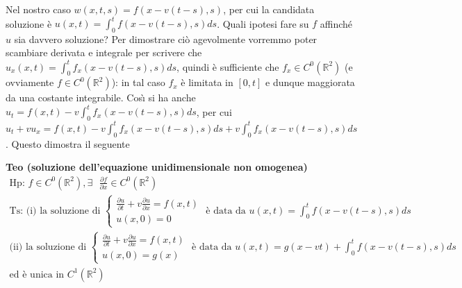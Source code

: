 \documentclass{article}
\begin{document}
Nel nostro caso $w\left( x,t,s\right) =f\left( x-v\left( t-s\right)
,s\right) $, per cui la candidata soluzione \`{e} $u\left( x,t\right)
=\int_{0}^{t}f\left( x-v\left( t-s\right) ,s\right) ds$. Quali ipotesi fare
su $f$ affinch\'{e} $u$ sia davvero soluzione? Per dimostrare ci\`{o}
agevolmente vorremmo poter scambiare derivata e integrale per scrivere che $%
u_{x}\left( x,t\right) =\int_{0}^{t}f_{x}\left( x-v\left( t-s\right)
,s\right) ds$, quindi \`{e} sufficiente che $f_{x}\in C^{0}\left( 
\mathbb{R}
^{2}\right) $ (e ovviamente $f\in C^{0}\left( 
\mathbb{R}
^{2}\right) $): in tal caso $f_{x}$ \`{e} limitata in $\left[ 0,t\right] $ e
dunque maggiorata da una costante integrabile. Cos\`{\i} si ha anche $%
u_{t}=f\left( x,t\right) -v\int_{0}^{t}f_{x}\left( x-v\left( t-s\right)
,s\right) ds$, per cui $u_{t}+vu_{x}=f\left( x,t\right)
-v\int_{0}^{t}f_{x}\left( x-v\left( t-s\right) ,s\right)
ds+v\int_{0}^{t}f_{x}\left( x-v\left( t-s\right) ,s\right) ds$. Questo
dimostra il seguente

\textbf{Teo (soluzione dell'equazione unidimensionale non omogenea)}%
\begin{gather*}
\text{Hp: }f\in C^{0}\left( 
\mathbb{R}
^{2}\right) ,\exists \text{ }\frac{\partial f}{\partial x}\in C^{0}\left( 
\mathbb{R}
^{2}\right) \\
\text{Ts: (i) la soluzione di }\left\{ 
\begin{array}{c}
\frac{\partial u}{\partial t}+v\frac{\partial u}{\partial x}=f\left(
x,t\right) \\ 
u\left( x,0\right) =0%
\end{array}%
\right. \text{ \`{e} data da }u\left( x,t\right) =\int_{0}^{t}f\left(
x-v\left( t-s\right) ,s\right) ds \\
\text{(ii) la soluzione di }\left\{ 
\begin{array}{c}
\frac{\partial u}{\partial t}+v\frac{\partial u}{\partial x}=f\left(
x,t\right) \\ 
u\left( x,0\right) =g\left( x\right)%
\end{array}%
\right. \text{ \`{e} data da }u\left( x,t\right) =g\left( x-vt\right)
+\int_{0}^{t}f\left( x-v\left( t-s\right) ,s\right) ds \\
\text{ed \`{e} unica in }C^{1}\left( 
\mathbb{R}
^{2}\right)
\end{gather*}
\end{document}
